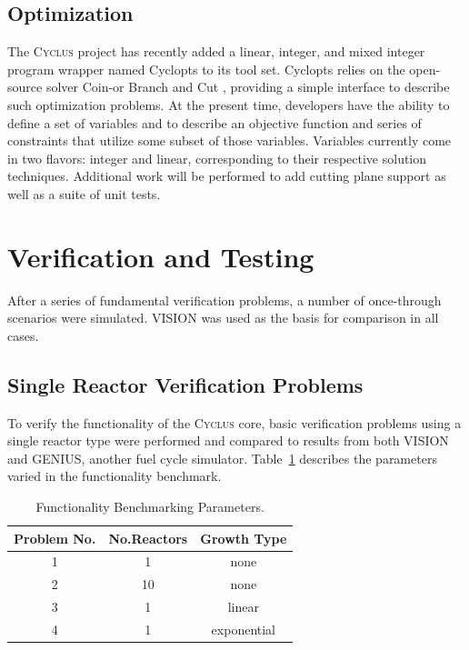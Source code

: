 \documentclass{anstrans}
\begin{document}
\subsection{Optimization}
The \textsc{Cyclus} project has recently added a linear, integer, and
mixed integer program wrapper named Cyclopts \cite{cyclopts2012} to
its tool set. Cyclopts relies on the open-source solver Coin-or Branch
and Cut \cite{coinCBC}, providing a simple interface to describe such
optimization problems. At the present time, developers have the
ability to define a set of variables and to describe an objective
function and series of constraints that utilize some subset of those
variables. Variables currently come in two flavors: integer and
linear, corresponding to their respective solution
techniques. Additional work will be performed to add cutting plane
support as well as a suite of unit tests.

\section{Verification and Testing}
After a series of fundamental verification problems, a number of
once-through scenarios were simulated.  VISION was used as the basis
for comparison in all cases.

\subsection{Single Reactor Verification Problems}
To verify the functionality of the \textsc{Cyclus} core, basic
verification problems using a single reactor type were performed and
compared to results from both VISION and GENIUS\cite{juchau2008}, another fuel cycle 
simulator. Table~\ref{tab:scenarioparams} describes the parameters varied in the 
functionality benchmark.
\begin{table} [h]
\centering
\begin{tabular} {|c|c|c|} 
\hline
Problem No. & No.Reactors & Growth Type \\
\hline
1           & 1          & none        \\
2           & 10         & none        \\
3           & 1          & linear      \\
4           & 1          & exponential \\
\hline
\end{tabular}
  \caption{Functionality Benchmarking Parameters.}
  \label{tab:scenarioparams}
\end{table}
\end{document}
